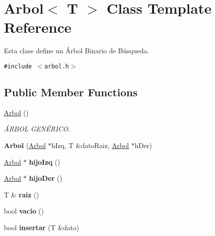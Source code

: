 \hypertarget{classArbol}{
\section{Arbol$<$ T $>$ Class Template Reference}
\label{classArbol}
}
Esta clase define un Árbol Binario de Búsqueda.  


{\tt \#include $<$arbol.h$>$}

\subsection*{Public Member Functions}
\begin{CompactItemize}
\item 
\hypertarget{classArbol_5612a2aa65ab954ec9ae442fdadef9de}{
\hyperlink{classArbol_5612a2aa65ab954ec9ae442fdadef9de}{Arbol} ()}
\label{classArbol_5612a2aa65ab954ec9ae442fdadef9de}

\begin{CompactList}\small\item\em ÁRBOL GENÉRICO. \item\end{CompactList}\item 
\hypertarget{classArbol_2487eb1849b924a28ce56ee9b7c34236}{
\textbf{Arbol} (\hyperlink{classArbol}{Arbol} $\ast$hIzq, T \&datoRaiz, \hyperlink{classArbol}{Arbol} $\ast$hDer)}
\label{classArbol_2487eb1849b924a28ce56ee9b7c34236}

\item 
\hypertarget{classArbol_da5f40bff1e6a6a0174a749d309bcb1c}{
\hyperlink{classArbol}{Arbol} $\ast$ \textbf{hijoIzq} ()}
\label{classArbol_da5f40bff1e6a6a0174a749d309bcb1c}

\item 
\hypertarget{classArbol_d433925e246961a80e690e46f9977780}{
\hyperlink{classArbol}{Arbol} $\ast$ \textbf{hijoDer} ()}
\label{classArbol_d433925e246961a80e690e46f9977780}

\item 
\hypertarget{classArbol_e7c912144568cd72804c893ffbe06415}{
T \& \textbf{raiz} ()}
\label{classArbol_e7c912144568cd72804c893ffbe06415}

\item 
\hypertarget{classArbol_7eccfbbe02911216fe285138347a8556}{
bool \textbf{vacio} ()}
\label{classArbol_7eccfbbe02911216fe285138347a8556}

\item 
\hypertarget{classArbol_9f2895622e071f4c6e6ca02c0191d552}{
bool \textbf{insertar} (T \&dato)}
\label{classArbol_9f2895622e071f4c6e6ca02c0191d552}


\end{CompactItemize}
